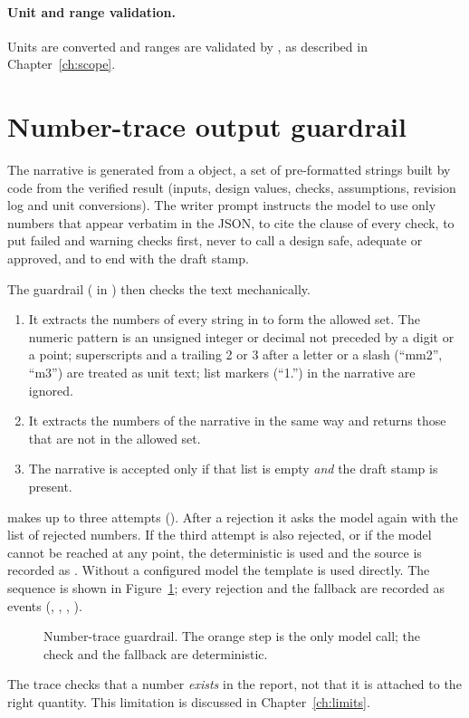 \paragraph{Unit and range validation.} Units are converted and ranges are validated by , as described in Chapter~\ref{ch:scope}.

\section{Number-trace output guardrail}
The narrative is generated from a  object, a set of pre-formatted strings built by code from the verified result (inputs, design values, checks, assumptions, revision log and unit conversions). The writer prompt instructs the model to use only numbers that appear verbatim in the JSON, to cite the clause of every check, to put failed and warning checks first, never to call a design safe, adequate or approved, and to end with the draft stamp.

The guardrail ( in ) then checks the text mechanically.
\begin{enumerate}
  \item It extracts the numbers of every string in  to form the allowed set. The numeric pattern is an unsigned integer or decimal not preceded by a digit or a point; superscripts and a trailing 2 or 3 after a letter or a slash (``mm2'', ``m3'') are treated as unit text; list markers (``1.'') in the narrative are ignored.
  \item It extracts the numbers of the narrative in the same way and returns those that are not in the allowed set.
  \item The narrative is accepted only if that list is empty \emph{and} the draft stamp is present.
\end{enumerate}
 makes up to three attempts (). After a rejection it asks the model again with the list of rejected numbers. If the third attempt is also rejected, or if the model cannot be reached at any point, the deterministic  is used and the source is recorded as . Without a configured model the template is used directly. The sequence is shown in Figure~\ref{fig:trace}; every rejection and the fallback are recorded as events (, , , ).

\begin{figure}[H]
\centering

\caption{Number-trace guardrail. The orange step is the only model call; the check and the fallback are deterministic.}
\label{fig:trace}
\end{figure}

The trace checks that a number \emph{exists} in the report, not that it is attached to the right quantity. This limitation is discussed in Chapter~\ref{ch:limits}.
